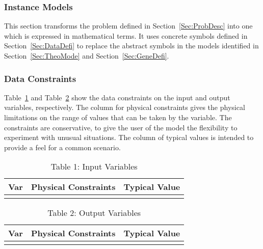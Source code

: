 \documentclass[12pt]{article}
\begin{document}
\subsubsection{Instance Models}
\label{Sec:IM}
This section transforms the problem defined in Section~\ref{Sec:ProbDesc} into one which is expressed in mathematical terms. It uses concrete symbols defined in Section~\ref{Sec:DataDefi} to replace the abstract symbols in the models identified in Section~\ref{Sec:TheoMode} and Section~\ref{Sec:GeneDefi}.
\subsubsection{Data Constraints}
\label{Sec:DC}
Table~\ref{Table:Tabl1:InpuVari} and Table~\ref{Table:Tabl2:OutpVari} show the data constraints on the input and output variables, respectively. The column for physical constraints gives the physical limitations on the range of values that can be taken by the variable. The constraints are conservative, to give the user of the model the flexibility to experiment with unusual situations. The column of typical values is intended to provide a feel for a common scenario.
\begin{longtable}{l l l}
\toprule
Var & Physical Constraints & Typical Value
\\
\midrule
\bottomrule
\caption{Table 1: Input Variables}
\label{Table:Tabl1:InpuVari}
\end{longtable}
\begin{longtable}{l l l}
\toprule
Var & Physical Constraints & Typical Value
\\
\midrule
\bottomrule
\caption{Table 2: Output Variables}
\label{Table:Tabl2:OutpVari}
\end{longtable}
\end{document}
